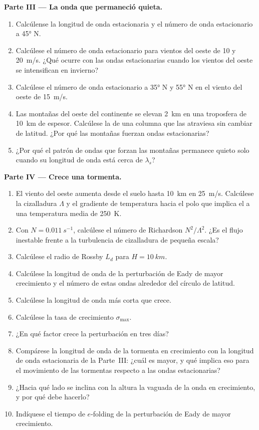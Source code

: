 \begin{problem}
\medskip\noindent\textbf{Parte III --- La onda que permaneció quieta.}
\begin{enumerate}[resume]
\item Calcúlense la longitud de onda estacionaria y el número de onda estacionario a
  \ang{45} N.
\item Calcúlese el número de onda estacionario para vientos del oeste de 10 y
  \qty{20}{m/s}. ¿Qué ocurre con las ondas estacionarias cuando los vientos del oeste
  se intensifican en invierno?
\item Calcúlese el número de onda estacionario a \ang{35} N y \ang{55} N en el
  viento del oeste de \qty{15}{m/s}.
\item Las montañas del oeste del continente se elevan \qty{2}{km} en una
  troposfera de \qty{10}{km} de espesor. Calcúlese la  de una columna
  que las atraviesa sin cambiar de latitud. ¿Por qué las montañas fuerzan
  ondas estacionarias?
\item ¿Por qué el patrón de ondas que forzan las montañas permanece quieto
  solo cuando su longitud de onda está cerca de $\lambda_s$?
\end{enumerate}

\medskip\noindent\textbf{Parte IV --- Crece una tormenta.}
\begin{enumerate}[resume]
\item El viento del oeste aumenta desde el suelo hasta \qty{10}{km} en
  \qty{25}{m/s}. Calcúlese la cizalladura $\Lambda$ y el gradiente de temperatura hacia el polo
  que implica el  a una temperatura media de
  \qty{250}{K}.
\item Con $N = \qty{0.011}{s^{-1}}$, calcúlese el número de Richardson
  $N^2/\Lambda^2$. ¿Es el flujo inestable frente a la turbulencia de cizalladura de pequeña escala?
\item Calcúlese el radio de Rossby $L_d$ para $H = \qty{10}{km}$.
\item Calcúlese la longitud de onda de la perturbación de Eady de mayor crecimiento y el
  número de estas ondas alrededor del círculo de latitud.
\item Calcúlese la longitud de onda más corta que crece.
\item Calcúlese la tasa de crecimiento $\sigma_{\max}$.
\item ¿En qué factor crece la perturbación en tres días?
\item Compárese la longitud de onda de la tormenta en crecimiento con la
  longitud de onda estacionaria de la Parte~III: ¿cuál es mayor, y qué implica eso para el
  movimiento de las tormentas respecto a las ondas estacionarias?
\item ¿Hacia qué lado se inclina con la altura la vaguada de la onda en crecimiento, y
  por qué debe hacerlo?
\item Indíquese el tiempo de $e$-folding de la perturbación de Eady de mayor crecimiento.
\end{enumerate}
\end{problem}
